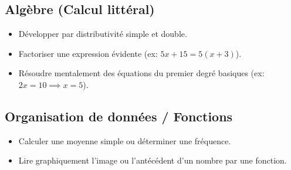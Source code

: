 \documentclass[11pt,a4paper]{article}
\begin{document}
\subsection*{Algèbre (Calcul littéral)}
\begin{itemize}[label=,leftmargin=*]
    \item Développer par distributivité simple et double.
    \item Factoriser une expression évidente (ex: $5x + 15 = 5(x + 3)$).
    \item Résoudre mentalement des équations du premier degré basiques (ex: $2x = 10 \implies x = 5$).
\end{itemize}

\subsection*{Organisation de données / Fonctions}
\begin{itemize}[label=,leftmargin=*]
    \item Calculer une moyenne simple ou déterminer une fréquence.
    \item Lire graphiquement l'image ou l'antécédent d'un nombre par une fonction.
\end{itemize}
\end{document}
